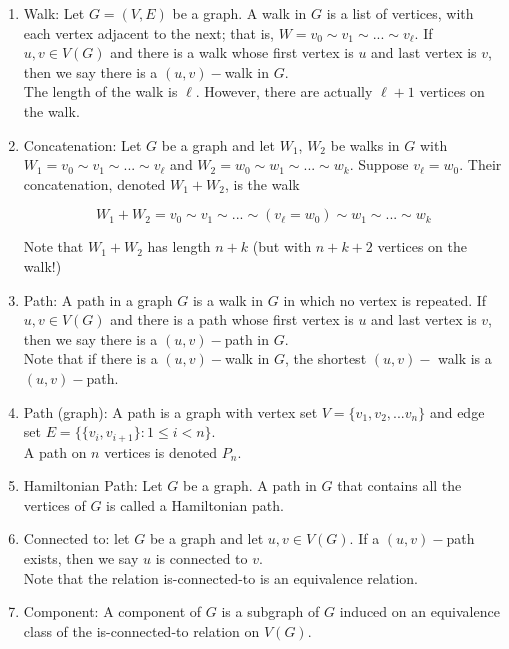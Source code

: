 \documentclass{article}
\begin{document}
\begin{enumerate}
    \item Walk: Let $G=(V,E)$ be a graph. A walk in $G$ is a list of vertices, with each vertex adjacent to the next; that is, $W=v_0\sim v_1\sim...\sim v_\ell$. If $u,v\in V(G)$ and there is a walk whose first vertex is $u$ and last vertex is $v$, then we say there is a $(u,v)-$walk in $G$.\\
    
    The length of the walk is $\ell$. However, there are actually $\ell +1$ vertices on the walk.
    
    \item Concatenation: Let $G$ be a graph and let $W_1$, $W_2$ be walks in $G$ with $W_1=v_0\sim v_1\sim ...\sim v_\ell$ and $W_2=w_0\sim w_1\sim ...\sim w_k$. Suppose $v_\ell=w_0$. Their concatenation, denoted $W_1+W_2$, is the walk 
    
    $$W_1+W_2=v_0\sim v_1\sim...\sim(v_\ell=w_0)\sim w_1\sim...\sim w_k$$
    
    Note that $W_1+W_2$ has length $n+k$ (but with $n+k+2$ vertices on the walk!)
    
    \item Path: A path in a graph $G$ is a walk in $G$ in which no vertex is repeated. If $u,v\in V(G)$ and there is a path whose first vertex is $u$ and last vertex is $v$, then we say there is a $(u,v)-$path in $G$. \\
    
    Note that if there is a $(u,v)-$walk in $G$, the shortest $(u,v)-$ walk is a $(u,v)-$path.
    
    \item Path (graph): A path is a graph with vertex set $V=\{v_1,v_2,...v_n\}$ and edge set $E=\{\{v_i,v_{i+1}\}:1\leq i<n\}$.\\
    
    A path on $n$ vertices is denoted $P_n$.
    
    \item Hamiltonian Path: Let $G$ be a graph. A path in $G$ that contains all the vertices of $G$ is called a Hamiltonian path.
    
    \item Connected to: let $G$ be a graph and let $u,v\in V(G)$. If a $(u,v)-$path exists, then we say $u$ is connected to $v$.\\
    
    Note that the relation is-connected-to is an equivalence relation.
    
    \item Component: A component of $G$ is a subgraph of $G$ induced on an equivalence class of the is-connected-to relation on $V(G)$.
    

\end{enumerate}
\end{document}
